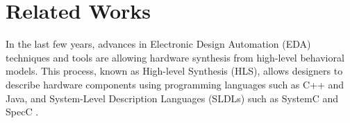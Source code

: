 \section{Related Works} \label{sota}
%
%

%

In the last few years, advances in Electronic Design Automation (EDA)
techniques and tools are allowing
hardware synthesis from high-level behavioral models.
This process, known as High-level Synthesis (HLS), allows designers to
describe hardware components using
programming languages such as C++ and Java, and
System-Level Description Languages (SLDLs) such as SystemC and SpecC
\cite{Gerstlauer:2009}.

